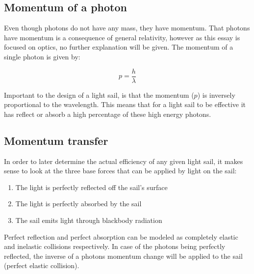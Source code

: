 \documentclass[14pt]{article}
\begin{document}
\subsection{Momentum of a photon}

Even though photons do not have any mass, they have momentum. That photons have momentum is a consequence of general relativity\autocite{openstax},
however as this essay is focused on optics, no further explanation will be given. The momentum of a single photon is given by:

\begin{equation}
  p = \frac{h}{\lambda}
  \label{eq:light_momentum}
\end{equation}

Important to the design of a light sail, is that the momentum ($p$) is inversely proportional to the wavelength. This means that for a light
sail to be effective it has reflect or absorb a high percentage of these high energy photons.

\subsection{Momentum transfer}

In order to later determine the actual efficiency of any given light sail, it makes sense to look at the three base forces that can
be applied by light on the sail:

\begin{enumerate}
  \item The light is perfectly reflected off the sail's surface
  \item The light is perfectly absorbed by the sail
  \item The sail emits light through blackbody radiation
\end{enumerate}

Perfect reflection and perfect absorption can be modeled as completely elastic and inelastic collisions respectively\autocite{paschotta}.
In case of the photons being perfectly reflected, the inverse of a photons momentum change will be applied to the sail
(perfect elastic collision).
\end{document}
